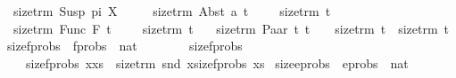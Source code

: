 \begin{isabellebody}
\ \ {\isachardoublequoteopen}size{\isacharunderscore}{\kern0pt}trm\ {\isacharparenleft}{\kern0pt}Susp\ pi\ X{\isacharparenright}{\kern0pt}\ {\isacharequal}{\kern0pt}\ {}{\isachardoublequoteclose}\ {\isacharbar}{\kern0pt}\isanewline
\ \ {\isachardoublequoteopen}size{\isacharunderscore}{\kern0pt}trm\ {\isacharparenleft}{\kern0pt}Abst\ a\ t{\isacharparenright}{\kern0pt}\ \ {\isacharequal}{\kern0pt}\ {}\ {\isacharplus}{\kern0pt}\ size{\isacharunderscore}{\kern0pt}trm\ t{\isachardoublequoteclose}\ {\isacharbar}{\kern0pt}\isanewline
\ \ {\isachardoublequoteopen}size{\isacharunderscore}{\kern0pt}trm\ {\isacharparenleft}{\kern0pt}Func\ F\ t{\isacharparenright}{\kern0pt}\ \ {\isacharequal}{\kern0pt}\ {}\ {\isacharplus}{\kern0pt}\ size{\isacharunderscore}{\kern0pt}trm\ t{\isachardoublequoteclose}\ {\isacharbar}{\kern0pt}\isanewline
\ \ {\isachardoublequoteopen}size{\isacharunderscore}{\kern0pt}trm\ {\isacharparenleft}{\kern0pt}Paar\ t\ t{\isacharprime}{\kern0pt}{\isacharparenright}{\kern0pt}\ {\isacharequal}{\kern0pt}\ {}\ {\isacharplus}{\kern0pt}\ {\isacharparenleft}{\kern0pt}size{\isacharunderscore}{\kern0pt}trm\ t{\isacharparenright}{\kern0pt}\ {\isacharplus}{\kern0pt}\ {\isacharparenleft}{\kern0pt}size{\isacharunderscore}{\kern0pt}trm\ t{\isacharprime}{\kern0pt}{\isacharparenright}{\kern0pt}{\isachardoublequoteclose}\isanewline
\isanewline
{}\isamarkupfalse%
\ size{\isacharunderscore}{\kern0pt}fprobs\ {\isacharcolon}{\kern0pt}{\isacharcolon}{\kern0pt}\ {\isachardoublequoteopen}fprobs\ {\isasymRightarrow}\ nat{\isachardoublequoteclose}\isanewline
\ \ \ \isanewline
\ \ \ \ {\isachardoublequoteopen}size{\isacharunderscore}{\kern0pt}fprobs\ {\isacharbrackleft}{\kern0pt}{\isacharbrackright}{\kern0pt}\ {\isacharequal}{\kern0pt}\ {}{\isachardoublequoteclose}\ {\isacharbar}{\kern0pt}\isanewline
\ \ \ \ {\isachardoublequoteopen}size{\isacharunderscore}{\kern0pt}fprobs\ {\isacharparenleft}{\kern0pt}x{\isacharhash}{\kern0pt}xs{\isacharparenright}{\kern0pt}\ {\isacharequal}{\kern0pt}\ {\isacharparenleft}{\kern0pt}size{\isacharunderscore}{\kern0pt}trm\ {\isacharparenleft}{\kern0pt}snd\ x{\isacharparenright}{\kern0pt}{\isacharparenright}{\kern0pt}{\isacharplus}{\kern0pt}{\isacharparenleft}{\kern0pt}size{\isacharunderscore}{\kern0pt}fprobs\ xs{\isacharparenright}{\kern0pt}{\isachardoublequoteclose}\isanewline
\isanewline
{}\isamarkupfalse%
\ size{\isacharunderscore}{\kern0pt}eprobs\ {\isacharcolon}{\kern0pt}{\isacharcolon}{\kern0pt}\ {\isachardoublequoteopen}eprobs\ {\isasymRightarrow}\ nat{\isachardoublequoteclose}\isanewline

\end{isabellebody}
